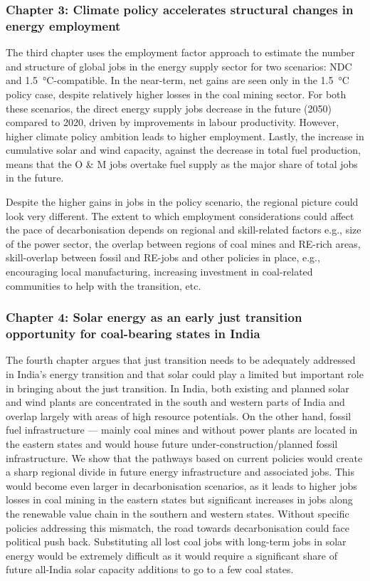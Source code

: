 \documentclass[../thesis.tex]{subfiles}
\begin{document}
\subsubsection{Chapter 3: Climate policy accelerates structural changes in energy employment}
The third chapter uses the employment factor approach to estimate the number and structure of global jobs in the energy supply sector for two scenarios: NDC and \SI{1.5}{\degreeCelsius}-compatible. In the near-term, net gains are seen only in the \SI{1.5}{\degreeCelsius} policy case, despite relatively higher losses in the coal mining sector. For both these scenarios, the direct energy supply jobs decrease in the future (2050) compared to 2020, driven by improvements in labour productivity. However, higher climate policy ambition leads to higher employment. Lastly, the increase in cumulative solar and wind capacity, against the decrease in total fuel production, means that the O \& M jobs overtake fuel supply as the major share of total jobs in the future.
 
Despite the higher gains in jobs in the policy scenario, the regional picture could look very different. The extent to which employment considerations could affect the pace of decarbonisation depends on regional and skill-related factors e.g., size of the power sector, the overlap between regions of coal mines and RE-rich areas, skill-overlap between fossil and RE-jobs and other policies in place, e.g., encouraging local manufacturing, increasing investment in coal-related communities to help with the transition, etc.


\subsubsection{Chapter 4: Solar energy as an early just transition opportunity for coal-bearing states in India}
The fourth chapter argues that just transition needs to be adequately addressed in India's energy transition and that solar could play a limited but important role in bringing about the just transition. In India, both existing and planned solar and wind plants are concentrated in the south and western parts of India and overlap largely with areas of high resource potentials. On the other hand, fossil fuel infrastructure --- mainly coal mines and without power plants are located in the eastern states and would house future under-construction/planned fossil infrastructure. We show that the pathways based on current policies would create a sharp regional divide in future energy infrastructure and associated jobs. This would become even larger in decarbonisation scenarios, as it leads to higher jobs losses in coal mining in the eastern states but significant increases in jobs along the renewable value chain in the southern and western states. Without specific policies addressing this mismatch, the road towards decarbonisation could face political push back. Substituting all lost coal jobs with long-term jobs in solar energy would be extremely difficult as it would require a significant share of future all-India solar capacity additions to go to a few coal states.
\end{document}
